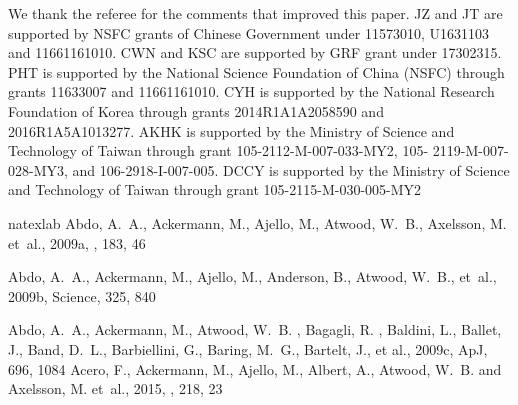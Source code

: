 \documentclass[12pt,preprint]{aastex}
\begin{document}
 We thank the referee for the comments that improved this paper.
 JZ and  JT are supported by NSFC grants of Chinese Government under 11573010,
 U1631103 and 11661161010. 
CWN and KSC are supported by GRF grant under 17302315. PHT is supported by the National Science Foundation of China (NSFC) through grants 11633007 and 11661161010. CYH is supported by the National Research Foundation of Korea through grants 2014R1A1A2058590 and 2016R1A5A1013277. AKHK is supported by the Ministry of Science and Technology of Taiwan through grant 105-2112-M-007-033-MY2, 105- 2119-M-007-028-MY3, and 106-2918-I-007-005. DCCY is supported by the Ministry of Science and Technology of Taiwan through grant 105-2115-M-030-005-MY2
\begin{thebibliography}{}
  \expandafter\ifx\csname natexlab\endcsname\relax\def\natexlab#1{#1}\fi
{}
  {Abdo}, A.~A., {Ackermann}, M., {Ajello}, M., {Atwood}, W.~B., {Axelsson}, M. {et~al.},
  2009a, \apjs, 183, 46

  {Abdo}, A.~A., {Ackermann}, M.,  {Ajello}, M.,  {Anderson}, B.,
  {Atwood}, W.~B., {et~al.}, 2009b, Science, 325, 840

  {Abdo}, A.~A., {Ackermann}, M., {Atwood}, W.~B. , {Bagagli}, R. ,
  {Baldini}, L., {Ballet}, J., {Band}, D.~L., {Barbiellini}, G.,
  {Baring}, M.~G., {Bartelt}, J., et al., 2009c, ApJ, 696, 1084
  {Acero}, F., {Ackermann}, M., {Ajello}, M., {Albert}, A.,
  {Atwood}, W.~B. and {Axelsson}, M. {et~al.}, 2015, \apjs, 218, 23


\end{thebibliography}
\end{document}
